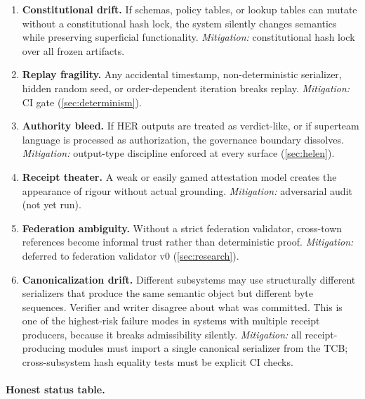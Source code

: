 \documentclass[11pt,a4paper]{article}
\theoremstyle{plain}
\theoremstyle{definition}
\theoremstyle{remark}
\begin{document}
\begin{enumerate}
  \item \textbf{Constitutional drift.}
        If schemas, policy tables, or lookup tables can mutate without a
        constitutional hash lock, the system silently changes semantics
        while preserving superficial functionality.
        \emph{Mitigation:} constitutional hash lock over all frozen artifacts.

  \item \textbf{Replay fragility.}
        Any accidental timestamp, non-deterministic serializer,
        hidden random seed, or order-dependent iteration breaks replay.
        \emph{Mitigation:} CI gate (\cref{sec:determinism}).

  \item \textbf{Authority bleed.}
        If HER outputs are treated as verdict-like,
        or if superteam language is processed as authorization,
        the governance boundary dissolves.
        \emph{Mitigation:} output-type discipline enforced at every surface (\cref{sec:helen}).

  \item \textbf{Receipt theater.}
        A weak or easily gamed attestation model creates the appearance of
        rigour without actual grounding.
        \emph{Mitigation:} adversarial audit (not yet run).

  \item \textbf{Federation ambiguity.}
        Without a strict federation validator, cross-town references become
        informal trust rather than deterministic proof.
        \emph{Mitigation:} deferred to federation validator v0 (\cref{sec:research}).

  \item \textbf{Canonicalization drift.}
        Different subsystems may use structurally different serializers that
        produce the same semantic object but different byte sequences.
        Verifier and writer disagree about what was committed.
        This is one of the highest-risk failure modes in systems with
        multiple receipt producers, because it breaks admissibility silently.
        \emph{Mitigation:} all receipt-producing modules must import
        a single canonical serializer from the TCB;
        cross-subsystem hash equality tests must be explicit CI checks.
\end{enumerate}

\paragraph{Honest status table.}
\end{document}
